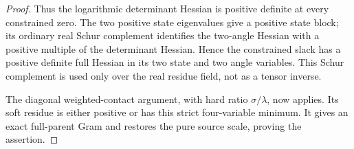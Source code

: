 \begin{proof}
Thus the logarithmic determinant Hessian is positive definite at every constrained zero. The two positive state eigenvalues give a positive state block; its ordinary real Schur complement identifies the two-angle Hessian with a positive multiple of the determinant Hessian. Hence the constrained slack has a positive definite full Hessian in its two state and two angle variables. This Schur complement is used only over the real residue field, not as a tensor inverse.

The diagonal weighted-contact argument, with hard ratio $\sigma/\lambda$, now applies. Its soft residue is either positive or has this strict four-variable minimum. It gives an exact full-parent Gram and restores the pure source scale, proving the assertion.
\end{proof}
